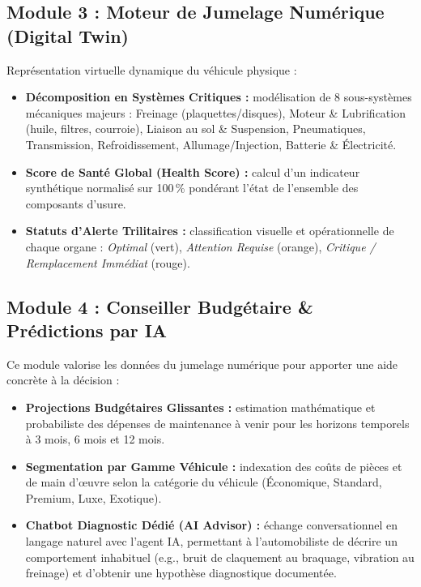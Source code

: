 \documentclass[12pt,a4paper,twoside,openright]{report}
\newcommand{\itembullet}{\textcolor{secondaryBlue}{$\blacktriangleright$}}
\begin{document}
  \subsection{Module 3 : Moteur de Jumelage Num\'erique (Digital Twin)}
  Repr\'esentation virtuelle dynamique du v\'ehicule physique :
  \begin{itemize}[label=\itembullet]
    \item \textbf{D\'ecomposition en Syst\`emes Critiques :} mod\'elisation de 8 sous-syst\`emes m\'ecaniques majeurs : Freinage (plaquettes/disques), Moteur \& Lubrification (huile, filtres, courroie), Liaison au sol \& Suspension, Pneumatiques, Transmission, Refroidissement, Allumage/Injection, Batterie \& \'Electricit\'e.
    \item \textbf{Score de Sant\'e Global (Health Score) :} calcul d'un indicateur synth\'etique normalis\'e sur 100\,\% pond\'erant l'\'etat de l'ensemble des composants d'usure.
    \item \textbf{Statuts d'Alerte Trilitaires :} classification visuelle et op\'erationnelle de chaque organe : \textit{Optimal} (vert), \textit{Attention Requise} (orange), \textit{Critique / Remplacement Imm\'ediat} (rouge).
  \end{itemize}

  \subsection{Module 4 : Conseiller Budg\'etaire \& Pr\'edictions par IA}
  Ce module valorise les donn\'ees du jumelage num\'erique pour apporter une aide concr\`ete \`a la d\'ecision :
  \begin{itemize}[label=\itembullet]
    \item \textbf{Projections Budg\'etaires Glissantes :} estimation math\'ematique et probabiliste des d\'epenses de maintenance \`a venir pour les horizons temporels \`a 3 mois, 6 mois et 12 mois.
    \item \textbf{Segmentation par Gamme V\'ehicule :} indexation des co\^uts de pi\`eces et de main d'\oe uvre selon la cat\'egorie du v\'ehicule (\'Economique, Standard, Premium, Luxe, Exotique).
    \item \textbf{Chatbot Diagnostic D\'edi\'e (AI Advisor) :} \'echange conversationnel en langage naturel avec l'agent IA, permettant \`a l'automobiliste de d\'ecrire un comportement inhabituel (e.g., bruit de claquement au braquage, vibration au freinage) et d'obtenir une hypoth\`ese diagnostique document\'ee.
  \end{itemize}
\end{document}
